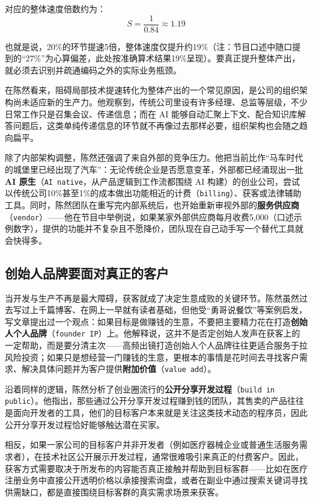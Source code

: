 \documentclass[UTF8,a4paper,11pt,fontset=fandol]{ctexart}
\begin{document}
对应的整体速度倍数约为：
\[
S = \frac{1}{0.84} \approx 1.19
\]

也就是说，20\%的环节提速5倍，整体速度仅提升约19\%（注：节目口述中随口提到的“27\%”为心算偏差，此处按准确算术结果19\%呈现）。要真正提升整体产出，就必须去识别并疏通编码之外的实际业务瓶颈。

在陈然看来，阻碍局部技术提速转化为整体产出的一个常见原因，是公司的组织架构尚未适应新的生产力。他观察到，传统公司里设有许多经理、总监等层级，不少日常工作只是召集会议、传递信息；而在 AI 能够自动汇聚上下文、配合知识库解答问题后，这类单纯传递信息的环节就不再像过去那样必要，组织架构也会随之趋向扁平。

除了内部架构调整，陈然还强调了来自外部的竞争压力。他把当前比作“马车时代的城堡里已经出现了汽车”：无论传统企业是否愿意变革，外部都已经涌现出一批\textbf{AI 原生}（\texttt{AI native}，从产品逻辑到工作流都围绕 AI 构建）的创业公司，尝试以传统公司10\%甚至1\%的成本做出功能相近的计费（\texttt{billing}）、获客或法律辅助工具。同时，陈然团队在重写完内部系统后，也开始重新审视外部的\textbf{服务供应商}（\texttt{vendor}）——他在节目中举例说，如果某家外部供应商每月收费5,000（口述示例数字），提供的功能并不复杂且不愿降价，团队现在自己动手写一个替代工具就会快得多。

\subsection{创始人品牌要面对真正的客户}
当开发与生产不再是最大障碍，获客就成了决定生意成败的关键环节。陈然虽然过去写过上千篇博客、在网上一早就有读者基础，但他受“勇哥说餐饮”等案例启发，写文章提出过一个观点：如果目标是做赚钱的生意，不要把主要精力花在打造\textbf{创始人个人品牌}（\texttt{founder IP}）上。他解释说，这并不是否定创始人发声在获客上的一定帮助，而是要分清主次——高频出镜打造创始人个人品牌往往更适合服务于拉风险投资；如果只是想经营一门赚钱的生意，更根本的事情是花时间去寻找客户需求、解决具体问题并为客户提供\textbf{附加价值}（\texttt{value add}）。

沿着同样的逻辑，陈然分析了创业圈流行的\textbf{公开分享开发过程}（\texttt{build in public}）。他指出，那些通过公开分享开发过程赚到钱的团队，其售卖的产品往往是面向开发者的工具，他们的目标客户本来就是关注这类技术动态的程序员，因此公开分享开发过程恰好能够触达潜在买家。

相反，如果一家公司的目标客户并非开发者（例如医疗器械企业或普通生活服务需求者），在技术社区公开展示开发过程，通常很难吸引来真正的付费客户。因此，获客方式需要取决于所发布的内容能否真正接触并帮助到目标客群——比如在医疗注册业务中直接公开透明价格以承接搜索询盘，或者在副业中通过搜索关键词寻找供需缺口，都是直接围绕目标客群的真实需求场景来获客。
\end{document}
